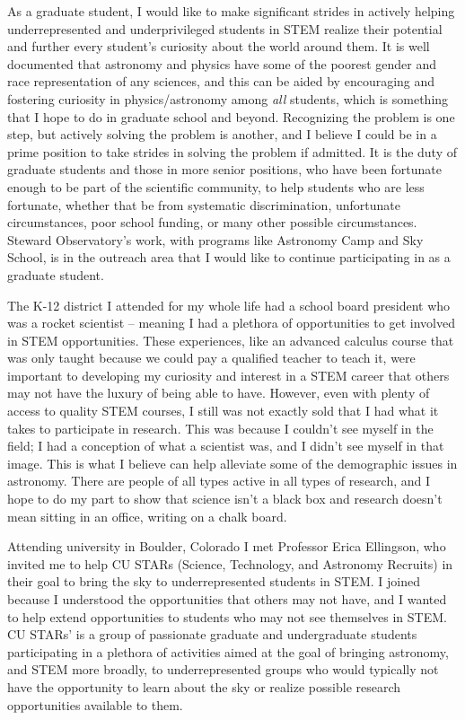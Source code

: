 \documentclass[11pt,letterpaper]{article}
\begin{document}
As a graduate student, I would like to make significant strides in actively helping underrepresented and underprivileged students in STEM realize their potential and further every student's curiosity about the world around them. It is well documented that astronomy and physics have some of the poorest gender and race representation of any sciences, and this can be aided by encouraging and fostering curiosity in physics/astronomy among \textit{all} students, which is something that I hope to do in graduate school and beyond. Recognizing the problem is one step, but actively solving the problem is another, and I believe I could be in a prime position to take strides in solving the problem if admitted. It is the duty of graduate students and those in more senior positions, who have been fortunate enough to be part of the scientific community, to help students who are less fortunate, whether that be from systematic discrimination, unfortunate circumstances, poor school funding, or many other possible circumstances. Steward Observatory's work, with programs like Astronomy Camp and Sky School, is in the outreach area that I would like to continue participating in as a graduate student.

The K-12 district I attended for my whole life had a school board president who was a rocket scientist -- meaning I had a plethora of opportunities to get involved in STEM opportunities. These experiences, like an advanced calculus course that was only taught because we could pay a qualified teacher to teach it, were important to developing my curiosity and interest in a STEM career that others may not have the luxury of being able to have. However, even with plenty of access to quality STEM courses, I still was not exactly sold that I had what it takes to participate in research. This was because I couldn't see myself in the field; I had a conception of what a scientist was, and I didn't see myself in that image. This is what I believe can help alleviate some of the demographic issues in astronomy. There are people of all types active in all types of research, and I hope to do my part to show that science isn't a black box and research doesn't mean sitting in an office, writing on a chalk board. 

Attending university in Boulder, Colorado I met Professor Erica Ellingson, who invited me to help CU STARs (Science, Technology, and Astronomy Recruits) in their goal to bring the sky to underrepresented students in STEM. I joined because I understood the opportunities that others may not have, and I wanted to help extend opportunities to students who may not see themselves in STEM. CU STARs’ is a group of passionate graduate and undergraduate students participating in a plethora of activities aimed at the goal of bringing astronomy, and STEM more broadly, to underrepresented groups who would typically not have the opportunity to learn about the sky or realize possible research opportunities available to them. 
\end{document}
